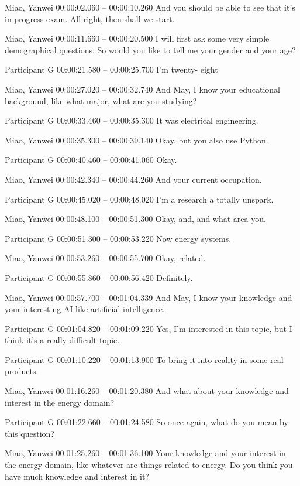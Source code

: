 {\parindent0pt
\tiny
\singlespacing
Miao, Yanwei 00:00:02.060 -- 00:00:10.260
And you should be able to see that it's in progress exam. All right, then shall we start.

Miao, Yanwei 00:00:11.660 -- 00:00:20.500
I will first ask some very simple demographical questions. So would you like to tell me your gender and your age?

Participant G 00:00:21.580 -- 00:00:25.700
I'm twenty- eight

Miao, Yanwei 00:00:27.020 -- 00:00:32.740
And May, I know your educational background, like what major, what are you studying?

Participant G 00:00:33.460 -- 00:00:35.300
It was electrical engineering.

Miao, Yanwei 00:00:35.300 -- 00:00:39.140
Okay, but you also use Python.

Participant G 00:00:40.460 -- 00:00:41.060
Okay.

Miao, Yanwei 00:00:42.340 -- 00:00:44.260
And your current occupation.

Participant G 00:00:45.020 -- 00:00:48.020
I'm a research a totally unspark.

Miao, Yanwei 00:00:48.100 -- 00:00:51.300
Okay, and, and what area you.

Participant G 00:00:51.300 -- 00:00:53.220
Now energy systems.

Miao, Yanwei 00:00:53.260 -- 00:00:55.700
Okay, related.

Participant G 00:00:55.860 -- 00:00:56.420
Definitely.

Miao, Yanwei 00:00:57.700 -- 00:01:04.339
And May, I know your knowledge and your interesting AI like artificial intelligence.

Participant G 00:01:04.820 -- 00:01:09.220
Yes, I'm interested in this topic, but I think it's a really difficult topic.

Participant G 00:01:10.220 -- 00:01:13.900
To bring it into reality in some real products.

Miao, Yanwei 00:01:16.260 -- 00:01:20.380
And what about your knowledge and interest in the energy domain?

Participant G 00:01:22.660 -- 00:01:24.580
So once again, what do you mean by this question?

Miao, Yanwei 00:01:25.260 -- 00:01:36.100
Your knowledge and your interest in the energy domain, like whatever are things related to energy. Do you think you have much knowledge and interest in it?

}
